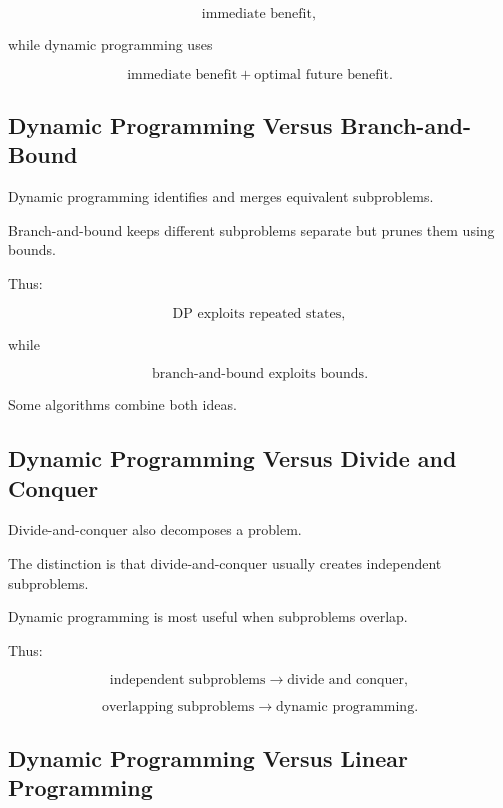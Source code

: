 \[
\boxed{
\text{immediate benefit},
}
\]

while dynamic programming uses

\[
\boxed{
\text{immediate benefit}
+
\text{optimal future benefit}.
}
\]

\subsection{Dynamic Programming Versus Branch-and-Bound}
\label{subsec:dp-versus-branch-bound}

Dynamic programming identifies and merges equivalent subproblems.

Branch-and-bound keeps different subproblems separate but prunes them
using bounds.

Thus:

\[
\boxed{
\text{DP exploits repeated states},
}
\]

while

\[
\boxed{
\text{branch-and-bound exploits bounds}.
}
\]

Some algorithms combine both ideas.

\subsection{Dynamic Programming Versus Divide and Conquer}
\label{subsec:dp-versus-divide-conquer}

Divide-and-conquer also decomposes a problem.

The distinction is that divide-and-conquer usually creates independent
subproblems.

Dynamic programming is most useful when subproblems overlap.

Thus:

\[
\boxed{
\text{independent subproblems}
\rightarrow
\text{divide and conquer},
}
\]

\[
\boxed{
\text{overlapping subproblems}
\rightarrow
\text{dynamic programming}.
}
\]

\subsection{Dynamic Programming Versus Linear Programming}
\label{subsec:dp-versus-lp}

